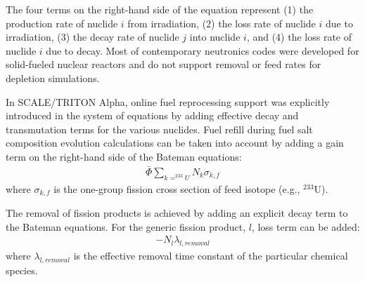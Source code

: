 \documentclass[letterpaper]{mandc2019}
\begin{document}
The four terms on the right-hand side of the equation represent (1) the production rate of nuclide $i$ from irradiation, (2) the loss rate of nuclide $i$ due to irradiation, (3) the decay rate of nuclide $j$ into nuclide $i$, and (4) the loss rate of nuclide $i$ due to decay. Most of contemporary neutronics codes were developed for solid-fueled nuclear reactors and do not support removal or feed rates for depletion simulations.

In SCALE/TRITON Alpha, online fuel reprocessing support was explicitly introduced in 
the system of 
equations by adding effective decay and transmutation terms for the 
various nuclides. Fuel refill during fuel salt composition evolution 
calculations can be taken into account by
adding a gain term on the right-hand side of the Bateman equations:
\begin{align} 
\bar{\Phi}\sum\limits_{k=^{233}U}N_{k}\sigma_{k,f}  \label{eq:feed_term}
\end{align}
where $\sigma_{k,f}$ is the one-group fission cross section of feed 
isotope (e.g., $^{233}$U).

The removal of fission products is achieved by adding an explicit decay 
term to the Bateman equations. For the generic fission product, $l$, 
loss term can be added:
\begin{align} 
- N_{l}\lambda_{l,removal}  \label{eq:rem_term}
\end{align}
where $\lambda_{l,removal}$ is the effective removal time constant of the particular chemical species. 
\end{document}
